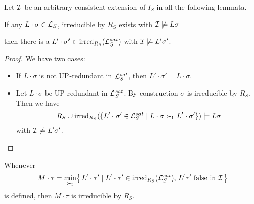             Let \( \mathcal{I} \) be an arbitrary consistent extension of \( I_S \)
% 
            in all the following lemmata.


       \begin{lemma}\label{existence}

        If any \( L\cdot\sigma\in\mathcal{L}_S \), irreducible by \( R_S \) exists with \( \mathcal{I}\not\models L\sigma \)

        then there is a \( L'\cdot\sigma'\in \operatorname{irred}_{R_S}(\mathcal{L}_S^{sat}) \) with \( \mathcal{I}\not\models L'\sigma' \).
       \end{lemma}

       \begin{proof}
            We have two cases:

       \begin{itemize}
           \item If \( L\cdot\sigma \) is not UP-redundant in \( \mathcal{L}_S^{sat} \),
            then \( L'\cdot\sigma'=L\cdot\sigma \).

           \item Let \( L\cdot\sigma \) be UP-redundant in \( \mathcal{L}_S^{sat} \).
        By construction \( \sigma \) is irreducible by \( R_S \). Then we have
       \begin{align*}
            R_S \cup \operatorname{irred}_{R_S}(
               \{
                L'\cdot\sigma'\in\mathcal{L}_S^{sat}
               \mid
                L\cdot\sigma \mathrel\succ_{\mathtt{L}} L'\cdot\sigma'
               \}
            )
           \models
            L\sigma
       \end{align*}
        with \( \mathcal{I}\not\models L'\sigma' \).
       \hfill \checkmark{}
       \end{itemize}
   \end{proof}


       \begin{lemma}\label{irreducible}
            Whenever
           \begin{gather*}
                M\cdot\tau = \min_{\mathrel\succ_{\mathtt{L}}}\!
               \left \{ \,
                L'\cdot\tau' \mid
                L'\cdot\tau' \in \operatorname{irred}_{R_S}(\mathcal{L}_S^{sat}), \,
                L'\tau'\text{ false in }\mathcal{I} \,
               \right \}
           \end{gather*}
            is defined, then \( M\cdot\tau \) is irreducible by \( R_S \).
       \end{lemma}

